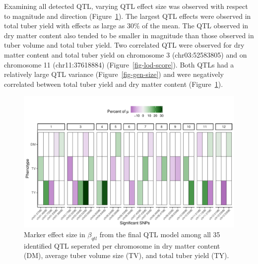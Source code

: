 Examining all detected QTL, varying QTL effect size was observed with
respect to magnitude and direction (Figure~\ref{fig-snp-size}). The
largest QTL effects were observed in total tuber yield with effects as
large as 30\% of the mean. The QTL observed in dry matter content also
tended to be smaller in magnitude than those observed in tuber volume
and total tuber yield. Two correlated QTL were observed for dry matter
content and total tuber yield on chromosome 3 (chr03:52583805) and on
chromosome 11 (chr11:37618884) (Figure~\ref{fig-lod-score}). Both QTLs
had a relatively large QTL variance (Figure~\ref{fig-gen-size}) and were
negatively correlated between total tuber yield and dry matter content
(Figure~\ref{fig-snp-size}).

\begin{figure}

{\centering \includegraphics{figs_04/fig-snp-size-1.pdf}

}

\caption{\label{fig-snp-size}Marker effect size in \(\beta_{qtl}\) from
the final QTL model among all 35 identified QTL seperated per chromosome in dry matter content
(DM), average tuber volume size (TV), and total tuber yield (TY).}

\end{figure}

